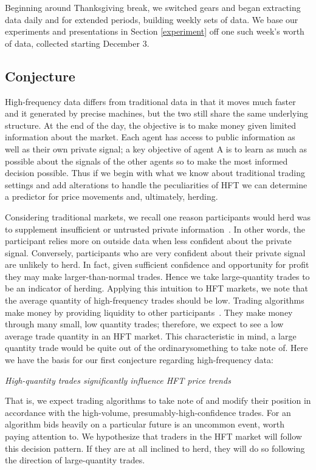 Beginning around Thanksgiving break, we switched gears and began extracting data daily and for extended periods, building weekly sets of data.
We base our experiments and presentations in Section \ref{experiment} off one such week's worth of data, collected starting December 3.

\subsection{Conjecture}
High-frequency data differs from traditional data in that it moves much faster and it generated by precise machines, but the two still share the same underlying structure.
At the end of the day, the objective is to make money given limited information about the market.
Each agent has access to public information as well as their own private signal; a key objective of agent A is to learn as much as possible about the signals of the other agents so to make the most informed decision possible.
Thus if we begin with what we know about traditional trading settings and add alterations to handle the peculiarities of HFT we can determine a predictor for price movements and, ultimately, herding.

Considering traditional markets, we recall one reason participants would herd was to supplement insufficient or untrusted private information~\cite[291]{bikhchandani}.
In other words, the participant relies more on outside data when less confident about the private signal.
Conversely, participants who are very confident about their private signal are unlikely to herd. 
In fact, given sufficient confidence and opportunity for profit they may make larger-than-normal trades. 
Hence we take large-quantity trades to be an indicator of herding. 
Applying this intuition to HFT markets, we note that the average quantity of high-frequency trades should be low.
Trading algorithms make money by providing liquidity to other participants~\cite{guo2012high}.
They make money through many small, low quantity trades; therefore, we expect to see a low average trade quantity in an HFT market. 
This characteristic in mind, a large quantity trade would be quite out of the ordinary\textemdash something to take note of.
Here we have the basis for our first conjecture regarding high-frequency data:

\vspace{0.5cm}
\hspace{1cm}  \emph{High-quantity trades significantly influence HFT price trends}
\vspace{0.5cm}

That is, we expect trading algorithms to take note of and modify their position in accordance with the high-volume, presumably-high-confidence trades.
For an algorithm bids heavily on a particular future is an uncommon event, worth paying attention to.
We hypothesize that traders in the HFT market will follow this decision pattern. 
If they are at all inclined to herd, they will do so following the direction of large-quantity trades.
